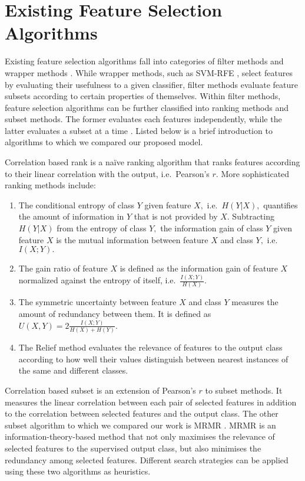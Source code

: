 \section{Existing Feature Selection Algorithms}

Existing feature selection algorithms fall into categories of filter
methods and wrapper methods \cite{guyon_jmlr03}. While
wrapper methods, such as SVM-RFE \cite{guyon2002gene}, select features
by evaluating their usefulness to a given classifier, filter methods
evaluate feature subsets according to certain properties of
themselves. Within filter methods, feature selection algorithms can be
further classified into ranking methods and subset methods. The former
evaluates each features independently, while the latter evaluates a
subset at a time \cite{brown2012conditional}. Listed below is a brief
introduction to algorithms to which we compared our proposed model.

Correlation based rank is a na\"{i}ve ranking algorithm that ranks
features according to their linear correlation with the output,
i.e.\ Pearson's $r.$ More sophisticated ranking methods include:
\begin{enumerate}
\item The conditional entropy of class $Y$ given feature $X,$
  i.e.\ $H\left(Y|X\right),$ quantifies the amount of information in
  $Y$ that is not provided by $X.$ Subtracting $H\left(Y|X\right)$
  from the entropy of class $Y,$ the information gain of class $Y$
  given feature $X$ is the mutual information between feature $X$ and
  class $Y,$ i.e.\ $I\left(X;Y\right).$
\item The gain ratio of feature $X$ is defined as the information gain
  of feature $X$ normalized against the entropy of itself,
  i.e.\ $\frac{I\left(X;Y\right)}{H\left(X\right)}.$
\item The symmetric uncertainty between feature $X$ and class $Y$
  measures the amount of redundancy between them. It is defined as
  $U\left(X,Y\right)=2\frac{I\left(X;Y\right)}{H\left(X\right)+H\left(Y\right)}.$
\item The Relief method \cite{kira1992feature} evaluates the relevance
  of features to the output class according to how well their values
  distinguish between nearest instances of the same and different
  classes.
\end{enumerate}

Correlation based subset \cite{Hall1998} is an extension
of Pearson's $r$ to subset methods. It measures the linear correlation
between each pair of selected features in addition to the correlation
between selected features and the output class. The other subset
algorithm to which we compared our work is MRMR \cite{peng2005}.
MRMR is an information-theory-based method that not only maximises
the relevance of selected features to the supervised output class,
but also minimises the redundancy among selected features. Different
search strategies can be applied using these two algorithms as
heuristics.

